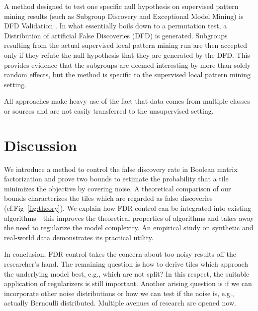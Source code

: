 A method designed to test one specific null hypothesis on supervised pattern mining results (such as Subgroup Discovery and Exceptional Model Mining) is DFD Validation \cite{duivesteijn2011exploiting}.  In what essentially boils down to a permutation test, a Distribution of artificial False Discoveries (DFD) is generated.  Subgroups resulting from the actual supervised local pattern mining run are then accepted only if they refute the null hypothesis that they are generated by the DFD.  This provides evidence that the subgroups are deemed interesting by more than solely random effects, but the method is specific to the supervised local pattern mining setting.

All approaches make heavy use of the fact that data comes from multiple classes or sources and are not easily transferred to the unsupervised setting. 
\section{Discussion}\label{sec:TP:discussion}
We introduce  a method to control the false discovery rate in Boolean matrix factorization and prove two bounds to estimate the probability that a tile minimizes the objective by covering noise.
A theoretical comparison of our bounds characterizes the tiles which are regarded as false discoveries (cf.\@ Fig~\ref{fig:theory}). 
We explain how FDR control can be integrated into existing algorithms---this improves the theoretical properties of algorithms and takes away the need to regularize the model complexity. An empirical study on synthetic and real-world data demonstrates its practical utility.

In conclusion, FDR control takes the concern about too noisy results off the researcher's hand. The remaining question is how to derive tiles which approach the underlying model best, e.g., which are not split? In this respect, the suitable application of regularizers is still important.
Another arising question is if we can incorporate other noise distributions or how we can test if the noise is, e.g., actually Bernoulli distributed. Multiple avenues of research are opened now.